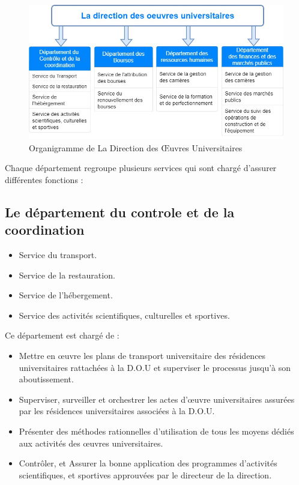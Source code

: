     \begin{figure}[H]
        \centering
            \includegraphics[scale=0.6]{chapitre1/direction-org.jpg}
        \caption{Organigramme de La Direction des Œuvres Universitaires}
    \end{figure}

    Chaque département regroupe plusieurs services qui sont chargé d'assurer différentes fonctions :

    \subsection{Le département du controle et de la coordination}
        \begin{itemize}
            \item Service du transport.
            \item Service de la restauration.
            \item Service de l'hébergement.
            \item Service des activités scientifiques, culturelles et sportives.\\
        \end{itemize}
        
        Ce département est chargé de :
        \begin{itemize}\renewcommand{\labelitemi}{$\bullet$}
            \item Mettre en œuvre les plans de transport universitaire des résidences universitaires rattachées à la \acs{D.O.U} et superviser le processus jusqu'à son aboutissement.
            \item Superviser, surveiller et orchestrer les actes d'œuvre universitaires assurées par les résidences universitaires associées à la \acs{D.O.U}.
            \item Présenter des méthodes rationnelles d'utilisation de tous les moyens dédiés aux activités des œuvres universitaires.
            \item Contrôler, et Assurer la bonne application des programmes d'activités scientifiques, et sportives approuvées par le directeur de la direction.
        \end{itemize}

